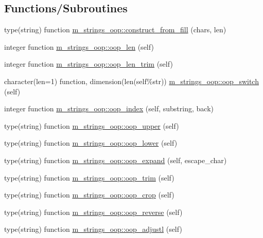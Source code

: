 \subsection*{Functions/\+Subroutines}
\begin{DoxyCompactItemize}
\item 
type(string) function \mbox{\hyperlink{namespacem__strings__oop_a411874cce2f16fee4d05d7528b510703}{m\+\_\+strings\+\_\+oop\+::construct\+\_\+from\+\_\+fill}} (chars, len)
\item 
integer function \mbox{\hyperlink{namespacem__strings__oop_a768ea13372aadbeae760c72d0b2a1939}{m\+\_\+strings\+\_\+oop\+::oop\+\_\+len}} (self)
\item 
integer function \mbox{\hyperlink{namespacem__strings__oop_a1b9bf3c6aac71ce1782fb3116ffb63f8}{m\+\_\+strings\+\_\+oop\+::oop\+\_\+len\+\_\+trim}} (self)
\item 
character(len=1) function, dimension(len(self\%str)) \mbox{\hyperlink{namespacem__strings__oop_a31be80e67fa4829b5ac48c530bd58b7b}{m\+\_\+strings\+\_\+oop\+::oop\+\_\+switch}} (self)
\item 
integer function \mbox{\hyperlink{namespacem__strings__oop_aafe02b26ccba21eb8a35e9fa99d6c790}{m\+\_\+strings\+\_\+oop\+::oop\+\_\+index}} (self, substring, back)
\item 
type(string) function \mbox{\hyperlink{namespacem__strings__oop_a9f4030a1ab2c7e2aa71b9d1f2754e67e}{m\+\_\+strings\+\_\+oop\+::oop\+\_\+upper}} (self)
\item 
type(string) function \mbox{\hyperlink{namespacem__strings__oop_ad49fed83544ede7b94948dee326ca3d7}{m\+\_\+strings\+\_\+oop\+::oop\+\_\+lower}} (self)
\item 
type(string) function \mbox{\hyperlink{namespacem__strings__oop_a5b96d2a6f242a096cd5788cf0802e825}{m\+\_\+strings\+\_\+oop\+::oop\+\_\+expand}} (self, escape\+\_\+char)
\item 
type(string) function \mbox{\hyperlink{namespacem__strings__oop_ab9238801d6c3af2fe7ee81c8d2c514ff}{m\+\_\+strings\+\_\+oop\+::oop\+\_\+trim}} (self)
\item 
type(string) function \mbox{\hyperlink{namespacem__strings__oop_aa1a395d359592720a842054fd0aaff0a}{m\+\_\+strings\+\_\+oop\+::oop\+\_\+crop}} (self)
\item 
type(string) function \mbox{\hyperlink{namespacem__strings__oop_ac3ab62e14d0b8445f51e084b810e2f76}{m\+\_\+strings\+\_\+oop\+::oop\+\_\+reverse}} (self)
\item 
type(string) function \mbox{\hyperlink{namespacem__strings__oop_a8e2457b4a1c4489e9600e340fa9ce533}{m\+\_\+strings\+\_\+oop\+::oop\+\_\+adjustl}} (self)

\end{DoxyCompactItemize}
